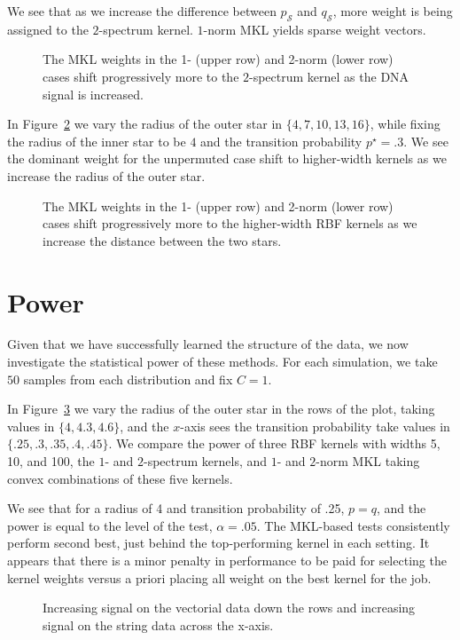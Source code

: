 We see that as we increase the difference between $p_{\mathcal{S}}$ and $q_{\mathcal{S}}$,
more weight is being assigned to the $2$-spectrum kernel.  $1$-norm MKL yields sparse weight
vectors.
\begin{figure}
  \begin{center}
    \resizebox{14.0cm}{!}{
      
    }
  \end{center}
\caption{The MKL weights in the 1- (upper row) and 2-norm (lower row) cases shift progressively more to
  the $2$-spectrum kernel as the DNA signal is increased.}
\label{fig:mkl_weights1}
\end{figure}

In Figure~\ref{fig:mkl_weights2} we vary the radius of the outer star in $\{4, 7, 10, 13, 16\}$,
while fixing the radius of the inner star to be $4$ and the transition probability $p^{\star} = .3$.
We see the dominant weight for the unpermuted case shift to higher-width kernels as we increase
the radius of the outer star.
\begin{figure}
  \begin{center}
    \resizebox{14.0cm}{!}{
      
    }
  \end{center}
\caption{The MKL weights in the 1- (upper row) and 2-norm (lower row) cases shift progressively more to
  the higher-width RBF kernels as we increase the distance between the two stars.}
\label{fig:mkl_weights2}
\end{figure}

\section{Power}
Given that we have successfully learned the structure of the data, we now
investigate the statistical power of these methods.  For each simulation, we take
$50$ samples from each distribution and fix $C = 1$.

In Figure~\ref{fig:mkl_power} we vary the radius of the outer star in the rows of the plot,
taking values in $\{4, 4.3, 4.6\}$, and the $x$-axis sees the transition probability
take values in $\{.25, .3, .35, .4, .45\}$.  We compare the power of three RBF kernels
with widths 5, 10, and 100, the $1$- and $2$-spectrum kernels, and $1$- and $2$-norm MKL
taking convex combinations of these five kernels.

We see that for a radius of 4 and transition probability of .25, $p=q$, and the power
is equal to the level of the test, $\alpha = .05$.  The MKL-based tests consistently
perform second best, just behind the top-performing kernel in each setting.  It appears
that there is a minor penalty in performance to be paid for selecting the kernel
weights versus a priori placing all weight on the best kernel for the job.
\begin{figure}
  \begin{center}
    \resizebox{14.0cm}{!}{
      
    }
  \end{center}
\caption{Increasing signal on the vectorial data down the rows and
  increasing signal on the string data across the x-axis.}
\label{fig:mkl_power}
\end{figure}


